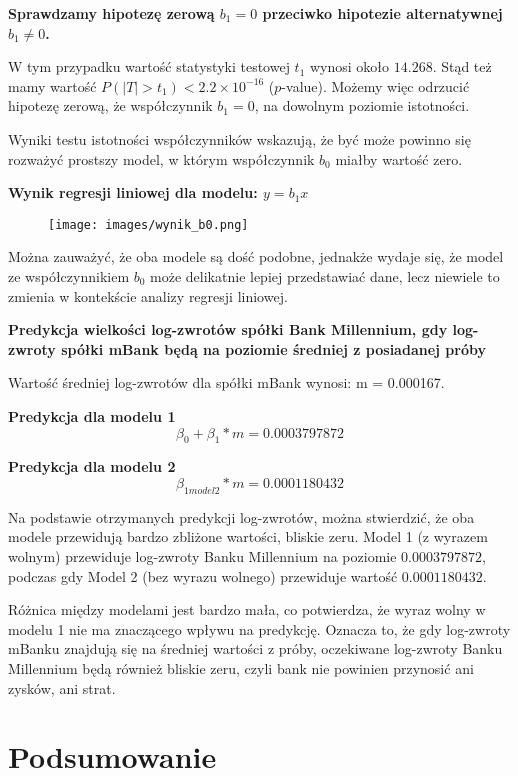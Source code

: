 \documentclass[12pt]{article}
\begin{document}
{\bf \small Sprawdzamy hipotezę zerową $b_1=0$ przeciwko hipotezie alternatywnej $b_1\neq0$.}

W tym przypadku wartość statystyki testowej $t_1$ wynosi około $14.268$. Stąd też mamy wartość $P(|T| > t_1) < 2.2 \times 10^{-16}$ ($p$-value). Możemy więc odrzucić hipotezę zerową, że współczynnik $b_1 = 0$, na dowolnym poziomie istotności.
\par
Wyniki testu istotności współczynników wskazują, że być może powinno się rozważyć prostszy model, w którym współczynnik $b_0$ miałby wartość zero.

{\bf \medium Wynik regresji liniowej dla modelu: $y = b_1x$}

\vspace{0.5 cm}
\begin{figure}[h]
    \centering
    \texttt{[image: images/wynik\_b0.png]}
\end{figure}

Można zauważyć, że oba modele są dość podobne, jednakże wydaje się, że model ze współczynnikiem $b_0$ może delikatnie lepiej przedstawiać dane, lecz niewiele to zmienia w kontekście analizy regresji liniowej.

\clearpage

{\bf \large Predykcja wielkości log-zwrotów spółki Bank Millennium, gdy log-zwroty spółki mBank będą na poziomie średniej z posiadanej próby}

Wartość średniej log-zwrotów dla spółki mBank wynosi: m = 0.000167.

{\bf \medium Predykcja dla modelu 1}
\[\beta_0+\beta_1*m = 0.0003797872  \]

{\bf \medium Predykcja dla modelu 2}
\[\beta_{1 model2}*m = 0.0001180432 \]


Na podstawie otrzymanych predykcji log-zwrotów, można stwierdzić, że oba modele przewidują bardzo zbliżone wartości, bliskie zeru. Model 1 (z wyrazem wolnym) przewiduje log-zwroty Banku Millennium na poziomie $0.0003797872$, podczas gdy Model 2 (bez wyrazu wolnego) przewiduje wartość $0.0001180432$.
\par
Różnica między modelami jest bardzo mała, co potwierdza, że wyraz wolny w modelu 1 nie ma znaczącego wpływu na predykcję. Oznacza to, że gdy log-zwroty mBanku znajdują się na średniej wartości z próby, oczekiwane log-zwroty Banku Millennium będą również bliskie zeru, czyli bank nie powinien przynosić ani zysków, ani strat.

\clearpage

\section {Podsumowanie}
\end{document}
